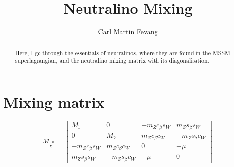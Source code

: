\documentclass[english, notitlepage]{article}
\title{Neutralino Mixing}
\author{Carl Martin Fevang}
\begin{document}
\maketitle

\begin{abstract}
    Here, I go through the essentials of neutralinos, where they are found in the MSSM superlagrangian, and the neutralino mixing matrix with its diagonalisation.
\end{abstract}

\section{Mixing matrix}

    \[
        M_{\tilde{\chi}^0} =
        \begin{bmatrix}
            M_1              & 0                & -m_Z c_\beta s_W & m_Z s_\beta s_W  \\
            0                & M_2              & m_Z c_\beta c_W  & -m_Z s_\beta c_W \\
            -m_Z c_\beta s_W & m_Z c_\beta c_W  & 0                & -\mu             \\
            m_Z s_\beta s_W  & -m_Z s_\beta c_W & -\mu             & 0
        \end{bmatrix}
    \]
\end{document}
